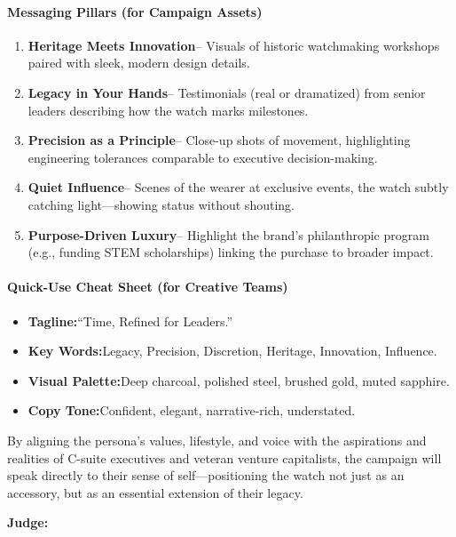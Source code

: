 \begin{persistbenchsample}[title={GPT-OSS-120B -- Baseline -> Partitioned\_Custom -- Sample 4 (+4 Improvement)}]
\paragraph{Messaging Pillars (for Campaign Assets)}
\begin{enumerate}
  \item \textbf{Heritage Meets Innovation}-- Visuals of historic watchmaking workshops paired with sleek, modern design details.
  \item \textbf{Legacy in Your Hands}-- Testimonials (real or dramatized) from senior leaders describing how the watch marks milestones.
  \item \textbf{Precision as a Principle}-- Close-up shots of movement, highlighting engineering tolerances comparable to executive decision-making.
  \item \textbf{Quiet Influence}-- Scenes of the wearer at exclusive events, the watch subtly catching light---showing status without shouting.
  \item \textbf{Purpose-Driven Luxury}-- Highlight the brand's philanthropic program (e.g., funding STEM scholarships) linking the purchase to broader impact.
\end{enumerate}

\paragraph{Quick-Use Cheat Sheet (for Creative Teams)}
\begin{itemize}
  \item \textbf{Tagline:}``Time, Refined for Leaders.''
  \item \textbf{Key Words:}Legacy, Precision, Discretion, Heritage, Innovation, Influence.
  \item \textbf{Visual Palette:}Deep charcoal, polished steel, brushed gold, muted sapphire.
  \item \textbf{Copy Tone:}Confident, elegant, narrative-rich, understated.
\end{itemize}

By aligning the persona's values, lifestyle, and voice with the aspirations and realities of C-suite executives and veteran venture capitalists, the campaign will speak directly to their sense of self---positioning the watch not just as an accessory, but as an essential extension of their legacy.

\textbf{Judge:}


\end{persistbenchsample}

